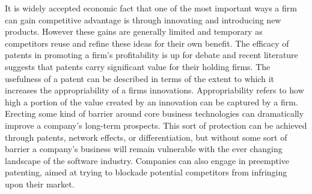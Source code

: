 It is widely accepted economic fact that one of the most important ways a firm can gain competitive advantage is through innovating and introducing new products. However these gains are generally limited and temporary as competitors reuse and refine these ideas for their own benefit.\autocite[81]{ceccagnoli2007appropriability}
The efficacy of patents in promoting a firm's profitability is up for debate and recent literature suggests that patents carry significant value for their holding firms.\autocite[]{ceccagnoli2007appropriability}
The usefulness of a patent can be described in terms of the extent to which it increases the appropriability of a firms innovations.\autocite[81]{ceccagnoli2007appropriability}
Appropriability refers to how high a portion of the value created by an innovation can be captured by a firm.\autocite[82]{ceccagnoli2007appropriability}
Erecting some kind of barrier around core business technologies can dramatically improve a company's long-term prospects.\autocite[]{HorizontalPlaysTechnology}
This sort of protection can be achieved through patents, network effects, or differentiation, but without some sort of barrier a company's business will remain vulnerable with the ever changing landscape of the software industry.\autocite[]{HorizontalPlaysTechnology}
Companies can also engage in preemptive patenting, aimed at trying to blockade potential competitors from infringing upon their market.\autocite[83]{ceccagnoli2007appropriability}

